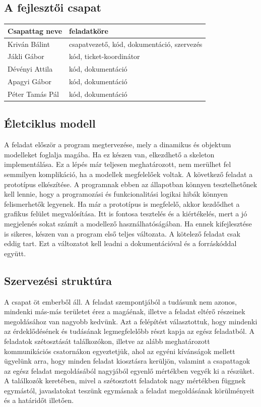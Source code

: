 \subsection{A fejlesztői csapat}

\begin{center}
\begin{tabular}{l | l}
	\textbf{Csapattag neve} & \textbf{feladatköre} \\
	\hline
	Kriván Bálint & csapatvezető, kód, dokumentáció, szervezés \\ 
	Jákli Gábor & kód, ticket-koordinátor \\ 
	Dévényi Attila & kód, dokumentáció \\ 
	Apagyi Gábor & kód, dokumentáció \\ 
	Péter Tamás Pál & kód, dokumentáció 
\end{tabular}
\end{center}

\subsection{Életciklus modell}

A feladat először a program megtervezése, mely a dinamikus és objektum modelleket foglalja magába. Ha ez készen van, elkezdhető a skeleton implementálása. Ez a lépés már teljesen meghatározott, nem merülhet fel semmilyen komplikáció, ha a modellek megfelelőek voltak.
A következő feladat a prototípus elkészítése. A programnak ebben az állapotban könnyen tesztelhetőnek kell lennie, hogy a programozási és funkcionalitási logikai hibák könnyen felismerhetők legyenek. Ha már a prototípus is megfelelő, akkor kezdődhet a grafikus felület megvalósítása. Itt is fontosa tesztelés és a kiértékelés, mert a jó megjelenés sokat számít a modellező használhatóságában. Ha ennek kifejlesztése is sikeres, készen van a program első teljes változata. A kötelező feladat csak eddig tart. Ezt a változatot kell leadni a dokumentációval és a forráskóddal együtt.

\subsection{Szervezési struktúra}

A csapat öt emberből áll. A feladat szempontjából a tudásunk nem azonos, mindenki más-más területet érez a magáénak, illetve a feladat eltérő részeinek megoldásához van nagyobb kedvünk. Azt a felépítést választottuk, hogy mindenki az érdeklődésének és tudásának legmegfelelőbb részt kapja az egész feladatból. A feladatok szétosztását találkozókon, illetve az alább meghatározott kommunikációs csatornákon egyeztetjük, ahol az egyéni kívánságok mellett ügyelünk arra, hogy minden feladat kiosztásra kerüljön, valamint a csapattagok az egész feladat megoldásából nagyjából egyenlő mértékben vegyék ki a részüket. A találkozók keretében, mivel a szétosztott feladatok nagy mértékben függnek egymástól, javaslatokat teszünk egymásnak a feladat megoldásának körülményeit és a határidőt illetően.\\

